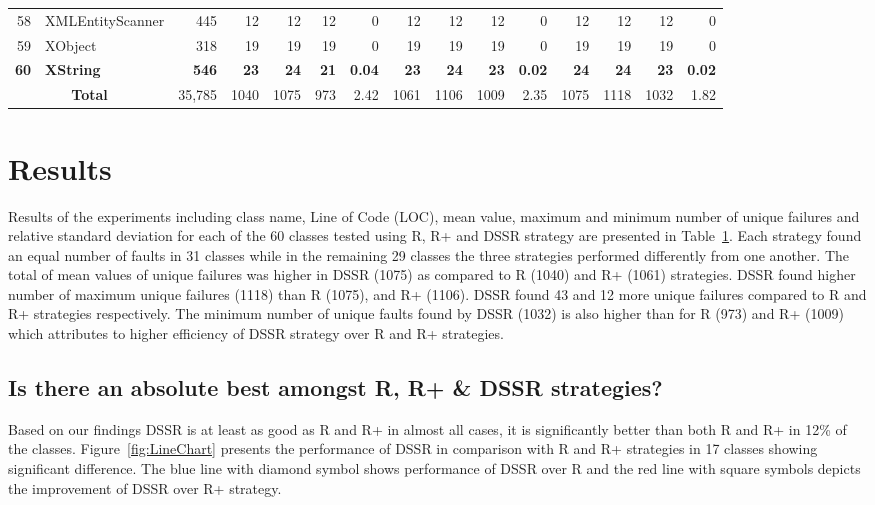 \begin{table} [htp!]
{\begin{tabularx}{1 \textwidth}{r l r r r r r r r r r r r r r}
58						& XMLEntityScanner			&445		& 12		&	12	&	12	& 	0					& 12		&  12		& 12		& 		0			& 12			& 12			& 12			&	0\\      
59						& XObject					&318		& 19		&	19	&	19	& 	0					& 19		&  19		& 19		& 		0			& 19			& 19			& 19			&	0\\      
\textbf{60}						& \textbf{XString}					&\textbf{546}		& \textbf{23}		&	\textbf{24}	&	\textbf{21}	& 	\textbf{0.04}					& \textbf{23}		&  \textbf{24}		& \textbf{23}		& 		\textbf{0.02}			& \textbf{24}			& \textbf{24}			& \textbf{23}			&	\textbf{0.02}\\      

    						\multicolumn{2}{c}{\textbf{Total}}	&35,785	&1040	&	1075	&    973	&	2.42				& 1061	&1106	&1009	&		2.35		& 1075		& 1118		& 1032		& 	1.82\\
     \end{tabularx} }
    \bigskip
    \label{table:Results}
\end{table}

\section{Results}\label{sec:res}
Results of the experiments including class name, Line of Code (LOC), mean value, maximum and minimum number of unique failures and relative standard deviation for each of the 60 classes tested using R, R+ and DSSR strategy are presented in Table~\ref{table:Results}. Each strategy found an equal number of faults in 31 classes while in the remaining 29 classes the three strategies performed differently from one another. The total of mean values of unique failures was higher in DSSR (1075) as compared to R (1040) and R+ (1061) strategies. 
DSSR found higher number of maximum unique failures (1118) than R (1075), and R+ (1106). DSSR found 43 and 12 more unique failures compared to R and R+ strategies respectively. The minimum number of unique faults found by DSSR (1032) is also higher than for R (973) and R+ (1009) which attributes to higher efficiency of DSSR strategy over R and R+ strategies. 


\subsection{Is there an absolute best amongst R, R+ \& DSSR strategies?}
Based on our findings DSSR is at least as good as R and R+ in almost all cases, it is significantly better than both R and R+ in 12\% of the classes. Figure~\ref{fig:LineChart} presents the performance of DSSR in comparison with R and R+ strategies in 17 classes showing significant difference. The blue line with diamond symbol shows performance of DSSR over R and the red line with square symbols depicts the improvement of DSSR over R+ strategy. 

